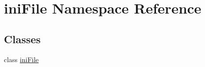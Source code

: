 \hypertarget{namespaceiniFile}{}\section{ini\+File Namespace Reference}
\label{namespaceiniFile}
\subsection*{Classes}
\begin{DoxyCompactItemize}
\item 
class \mbox{\hyperlink{classiniFile_1_1iniFile}{ini\+File}}
\end{DoxyCompactItemize}
